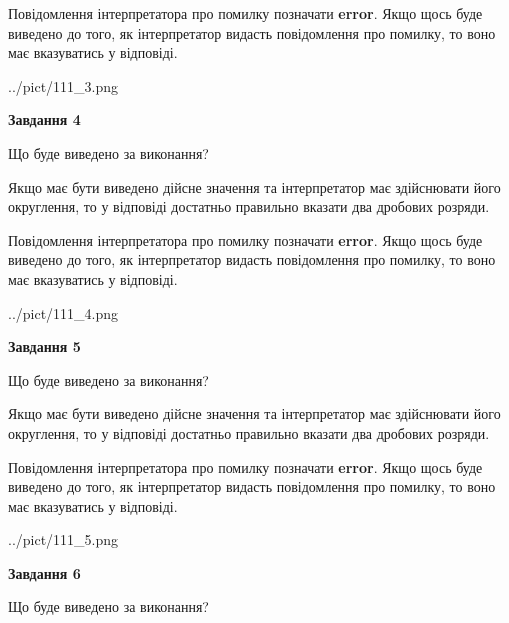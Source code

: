 \documentclass[12pt, ukrainian]{article}
\begin{document}
{\begin {Large}
Повідомлення інтерпретатора про помилку позначати \textbf{error}.
Якщо щось буде виведено до того, як інтерпретатор видасть повідомлення про помилку, 
то воно має вказуватись у відповіді. \par

\begin{center}
	{../pict/111_3.png}
\end{center}
\newpage

{\begin {center}\textbf{Завдання 4}\end {center}}\par
Що буде виведено за виконання? \par

Якщо має бути виведено дійсне значення та інтерпретатор має здійснювати його округлення, 
то у відповіді достатньо правильно вказати два дробових розряди.

Повідомлення інтерпретатора про помилку позначати \textbf{error}.
Якщо щось буде виведено до того, як інтерпретатор видасть повідомлення про помилку, 
то воно має вказуватись у відповіді. \par

\begin{center}
	{../pict/111_4.png}
\end{center}
\newpage

{\begin {center}\textbf{Завдання 5}\end {center}}\par
Що буде виведено за виконання? \par

Якщо має бути виведено дійсне значення та інтерпретатор має здійснювати його округлення, 
то у відповіді достатньо правильно вказати два дробових розряди.

Повідомлення інтерпретатора про помилку позначати \textbf{error}.
Якщо щось буде виведено до того, як інтерпретатор видасть повідомлення про помилку, 
то воно має вказуватись у відповіді. \par

\begin{center}
	{../pict/111_5.png}
\end{center}
\newpage

{\begin {center}\textbf{Завдання 6}\end {center}}\par
Що буде виведено за виконання? \par


\end{Large}}
\end{document}
